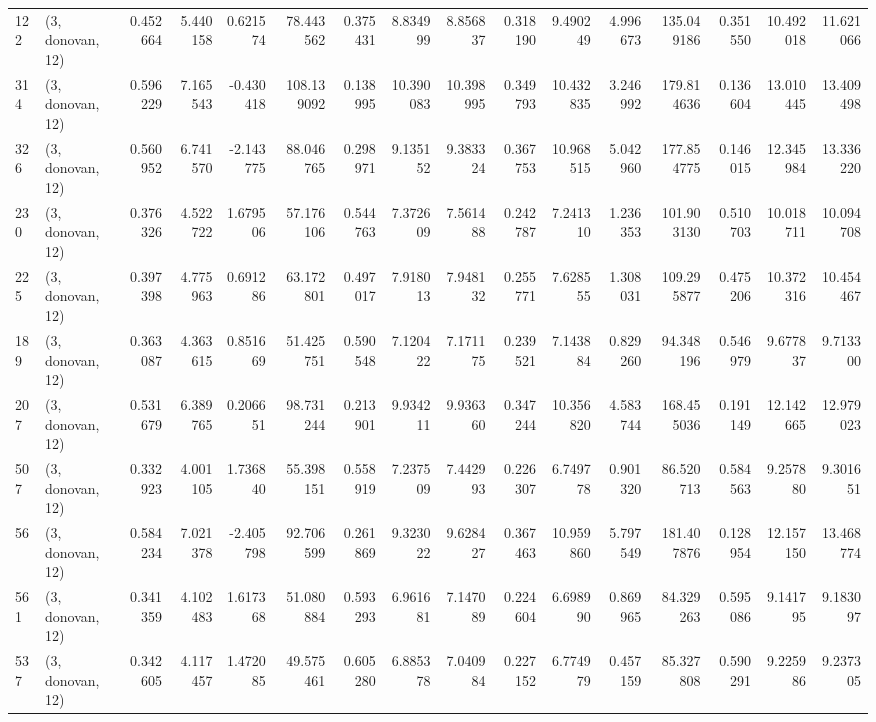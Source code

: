 \begin{tabular}{llrrrrrrrrrrrrrr}
122 &  (3, donovan, 12) &   0.452664 &   5.440158 &   0.621574 &    78.443562 &   0.375431 &   8.834999 &   8.856837 &  0.318190 &   9.490249 &   4.996673 &    135.049186 &   0.351550 &  10.492018 &   11.621066 \\
314 &  (3, donovan, 12) &   0.596229 &   7.165543 &  -0.430418 &   108.139092 &   0.138995 &  10.390083 &  10.398995 &  0.349793 &  10.432835 &   3.246992 &    179.814636 &   0.136604 &  13.010445 &   13.409498 \\
326 &  (3, donovan, 12) &   0.560952 &   6.741570 &  -2.143775 &    88.046765 &   0.298971 &   9.135152 &   9.383324 &  0.367753 &  10.968515 &   5.042960 &    177.854775 &   0.146015 &  12.345984 &   13.336220 \\
230 &  (3, donovan, 12) &   0.376326 &   4.522722 &   1.679506 &    57.176106 &   0.544763 &   7.372609 &   7.561488 &  0.242787 &   7.241310 &   1.236353 &    101.903130 &   0.510703 &  10.018711 &   10.094708 \\
225 &  (3, donovan, 12) &   0.397398 &   4.775963 &   0.691286 &    63.172801 &   0.497017 &   7.918013 &   7.948132 &  0.255771 &   7.628555 &   1.308031 &    109.295877 &   0.475206 &  10.372316 &   10.454467 \\
189 &  (3, donovan, 12) &   0.363087 &   4.363615 &   0.851669 &    51.425751 &   0.590548 &   7.120422 &   7.171175 &  0.239521 &   7.143884 &   0.829260 &     94.348196 &   0.546979 &   9.677837 &    9.713300 \\
207 &  (3, donovan, 12) &   0.531679 &   6.389765 &   0.206651 &    98.731244 &   0.213901 &   9.934211 &   9.936360 &  0.347244 &  10.356820 &   4.583744 &    168.455036 &   0.191149 &  12.142665 &   12.979023 \\
507 &  (3, donovan, 12) &   0.332923 &   4.001105 &   1.736840 &    55.398151 &   0.558919 &   7.237509 &   7.442993 &  0.226307 &   6.749778 &   0.901320 &     86.520713 &   0.584563 &   9.257880 &    9.301651 \\
56  &  (3, donovan, 12) &   0.584234 &   7.021378 &  -2.405798 &    92.706599 &   0.261869 &   9.323022 &   9.628427 &  0.367463 &  10.959860 &   5.797549 &    181.407876 &   0.128954 &  12.157150 &   13.468774 \\
561 &  (3, donovan, 12) &   0.341359 &   4.102483 &   1.617368 &    51.080884 &   0.593293 &   6.961681 &   7.147089 &  0.224604 &   6.698990 &   0.869965 &     84.329263 &   0.595086 &   9.141795 &    9.183097 \\
537 &  (3, donovan, 12) &   0.342605 &   4.117457 &   1.472085 &    49.575461 &   0.605280 &   6.885378 &   7.040984 &  0.227152 &   6.774979 &   0.457159 &     85.327808 &   0.590291 &   9.225986 &    9.237305 \\

\end{tabular}
